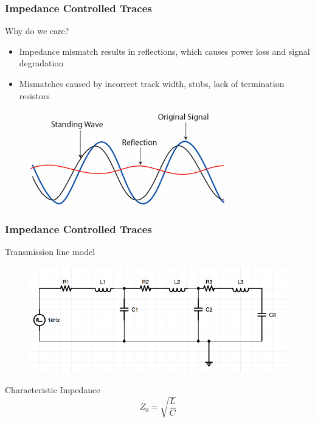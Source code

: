 \documentclass[t]{beamer}
\begin{document}
\begin{frame}
\frametitle{Impedance Controlled Traces}
Why do we care?\\
\begin{itemize}
	\item Impedance mismatch results in reflections, which causes power loss and signal degradation 
	\item Mismatches caused by incorrect track width, stubs, lack of termination resistors 
\end{itemize}
\begin{figure}
	\includegraphics[width=0.8\linewidth]{reflections.png}
\end{figure}

\end{frame}
\begin{frame}
\frametitle{Impedance Controlled Traces}
Transmission line model\\
\begin{figure}
	\includegraphics[width=0.7\linewidth]{transmissionLine.png}
\end{figure}
Characteristic Impedance
$$ Z_0 = \sqrt{\frac{L}{C}} $$
\end{frame}
\end{document}
